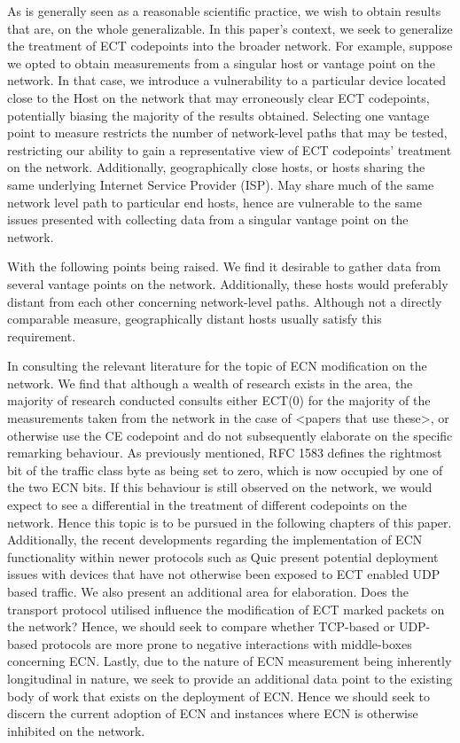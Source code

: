 \documentclass{l4proj}
\begin{document}
\label{sec:general}

As is generally seen as a reasonable scientific practice, we wish to obtain results that are, on the whole generalizable. In this paper's context, we seek to generalize the treatment of ECT codepoints into the broader network. For example, suppose we opted to obtain measurements from a singular host or vantage point on the network. In that case, we introduce a vulnerability to a particular device located close to the Host on the network that may erroneously clear ECT codepoints, potentially biasing the majority of the results obtained. Selecting one vantage point to measure restricts the number of network-level paths that may be tested, restricting our ability to gain a representative view of ECT codepoints' treatment on the network. Additionally, geographically close hosts, or hosts sharing the same underlying Internet Service Provider (ISP). May share much of the same network level path to particular end hosts, hence are vulnerable to the same issues presented with collecting data from a singular vantage point on the network. 

With the following points being raised. We find it desirable to gather data from several vantage points on the network. Additionally, these hosts would preferably distant from each other concerning network-level paths. Although not a directly comparable measure, geographically distant hosts usually satisfy this requirement.

In consulting the relevant literature for the topic of ECN modification on the network. We find that although a wealth of research exists in the area, the majority of research conducted consults either ECT(0) for the majority of the measurements taken from the network in the case of <papers that use these>, or otherwise use the CE codepoint and do not subsequently elaborate on the specific remarking behaviour. As previously mentioned, RFC 1583 defines the rightmost bit of the traffic class byte as being set to zero, which is now occupied by one of the two ECN bits. If this behaviour is still observed on the network, we would expect to see a differential in the treatment of different codepoints on the network. Hence this topic is to be pursued in the following chapters of this paper. Additionally, the recent developments regarding the implementation of ECN functionality within newer protocols such as Quic present potential deployment issues with devices that have not otherwise been exposed to ECT enabled UDP based traffic. We also present an additional area for elaboration. Does the transport protocol utilised influence the modification of ECT marked packets on the network? Hence, we should seek to compare whether TCP-based or UDP-based protocols are more prone to negative interactions with middle-boxes concerning ECN. Lastly, due to the nature of ECN measurement being inherently longitudinal in nature, we seek to provide an additional data point to the existing body of work that exists on the deployment of ECN. Hence we should seek to discern the current adoption of ECN and instances where ECN is otherwise inhibited on the network.
\end{document}
